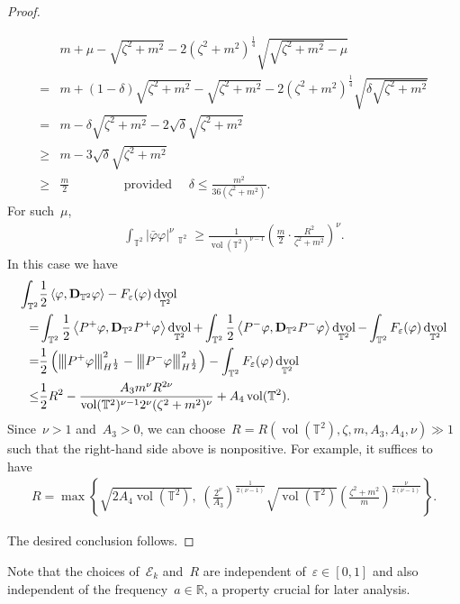 \documentclass[11pt,final]{amsart}
\newcommand{\tnorm}[1]{%
  \left\vert\kern-0.3ex\left\vert\kern-0.3ex\left\vert #1 \right\vert\kern-0.3ex\right\vert\kern-0.3ex\right\vert
}
\newcommand{\R}{\mathbb{R}}
\newcommand{\T}{\mathbb{T}}
\newcommand{\dd}{\mathop{}\!\mathrm{d}}
\newcommand{\eps}{\varepsilon}
\newcommand{\pD}{\mathbf{D}}
\newcommand{\Abracket}[1]{\left<#1\right>} %
\newcommand{\parenthesis}[1]{\left(#1\right)} %
\newcommand{\braces}[1]{\left\{#1\right\}} %
\DeclareMathOperator{\dv}{\dd{vol}}
\DeclareMathOperator{\vol}{vol}
\begin{document}
\begin{proof}
\begin{itemize}
\begin{align}
   &m+\mu-\sqrt{\zeta^2+m^2} -2(\zeta^2+m^2)^{\frac{1}{4}}\sqrt{\sqrt{ \zeta^2+m^2 }  -\mu}  \\
   =& m+(1-\delta)\sqrt{\zeta^2+m^2}-\sqrt{\zeta^2+m^2} -2(\zeta^2+m^2)^{\frac{1}{4}}\sqrt{\delta\sqrt{\zeta^2+m^2}}\\
   =& m -\delta\sqrt{ \zeta^2+m^2 }-2\sqrt{\delta}\sqrt{ \zeta^2+m^2 }\\
   \geq& m-3\sqrt{\delta}\sqrt{ \zeta^2+m^2 }\\
   \geq& \frac{m}{2} \qquad\qquad \mbox{ provided }\quad \delta\leq\frac{m^2}{36(\zeta^2+m^2)}.
\end{align}
For such~$\mu$, 
\begin{align}
    \int_{\T^2} |\bar{\varphi}\varphi|^\nu \dv_{\T^2}
    \geq  \frac{1}{\vol(\T^2)^{\nu -1}} \parenthesis{\frac{m}{2}\cdot\frac{R^2}{\zeta^2+m^2}}^{\nu}.
\end{align}
In this case we have
\begin{align}
    \int_{\T^2} & \frac{1}{2}\Abracket{\varphi,\pD_{\T^2} \varphi}- F_\eps(\varphi) \dv_{\T^2} \\
    =& \int_{\T^2} \frac{1}{2}\Abracket{P^+\varphi,\pD_{\T^2} P^+\varphi} \dv_{\T^2} + \int_{\T^2}\frac{1}{2}\Abracket{P^-\varphi,\pD_{\T^2}P^-\varphi} \dv_{\T^2} - \int_{\T^2} F_\eps(\varphi)\dv_{\T^2} \\
    =&\frac{1}{2}\parenthesis{ \tnorm{P^+\varphi }_{H^{\frac{1}{2}}}^2 - \tnorm{P^-\varphi}_{H^{\frac{1}{2}}}^2  }
     -\int_{\T^2} F_\eps(\varphi)\dv_{\T^2}\\
    \leq & \frac{1}{2}R^2
    - \frac{A_3m^\nu R^{2\nu}}{\vol(\T^2)^{\nu-1} 2^\nu({\zeta^2+m^2})^\nu}
     +  A_4 \vol(\T^2).
\end{align}
Since~$\nu>1$ and~$A_3>0$, we can choose~$R=R(\vol(\T^2), \zeta,m, A_3, A_4, \nu)\gg 1$ such that the right-hand side above is nonpositive.
For example, it suffices to have 
\begin{align}
    R=\max\braces{\sqrt{2A_4 \vol(\T^2)} , \; \parenthesis{\frac{2^\nu}{A_3}}^{\frac{1}{2(\nu-1)}} \sqrt{\vol(\T^2)} \parenthesis{\frac{\zeta^2+m^2}{m}}^{\frac{\nu}{2(\nu-1)}} }. 
\end{align}
\end{itemize}
The desired conclusion follows.
\end{proof}
Note that the choices of~$\mathscr{E}_k$ and~$R$ are independent of~$\eps\in [0,1]$ and also independent of the frequency~$a\in \R$, a property crucial for later analysis.
\end{document}
